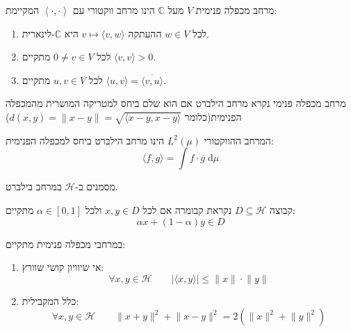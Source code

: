 \documentclass{tstextbook}
\begin{document}
\begin{reminder}
מרחב מכפלה פנימית \(V\) מעל \(\mathbb{C}\) הינו מרחב ווקטורי עם \(\left\langle  \cdot,\cdot  \right\rangle\) המקיימת:

  \begin{enumerate}
    \item לכל \(w \in V\) ההעתקה \(v\mapsto \langle v,w \rangle\) היא \(\mathbb{C}\)-לינארית. 


    \item לכל \(0\neq v \in V\) מתקיים \(\langle v,v \rangle>0\). 


    \item לכל \(u,v \in V\) מתקיים \(\langle u,v \rangle=\overline{\langle v,u \rangle}\). 


  \end{enumerate}
\end{reminder}
\begin{definition}
מרחב מכפלה פנימי נקרא מרחב הילברט אם הוא שלם ביחס למטריקה המושרית מהמכפלה הפנימית(כלומר \(d(x,y)=\lVert x-y \rVert=\sqrt{ \langle x-y,x-y \rangle }\))

\end{definition}
\begin{corollary}
המרחב ההווקטורי \(L^2\left( \mu \right)\) הינו מרחב הילברט ביחס למכפלה הפנימית:
$$\langle f,g \rangle =\int f \cdot \overline{g}  \;\mathrm{d} \mu $$

\end{corollary}
\begin{symbolize}
מסמנים ב-\(\mathcal{H}\) במרחב בילברט.

\end{symbolize}
\begin{definition}
קבוצה \(D \subseteq \mathcal{H}\) נקראת קבומרה אם לכל \(x,y \in D\) ולכל \(\alpha \in[0,1]\) מתקיים:
$$\alpha x+\left( 1-\alpha \right)y \in D$$

\end{definition}
\begin{reminder}
במרחבי מכפלה פנימית מתקיים:

  \begin{enumerate}
    \item אי שיוויון קושי שוורץ: 
$$\forall x,y \in \mathcal{H}\qquad \left\lvert  \langle x,y \rangle   \right\rvert \leq \lVert x \rVert \cdot \lVert y 
\rVert $$


    \item כלל המקבילית: 
$$\forall x,y \in \mathcal{H} \qquad \lVert x+y \rVert ^{2}+\lVert x-y \rVert ^{2}=2\left( \lVert x \rVert^{2}+\lVert y \rVert ^{2}  \right)$$


  \end{enumerate}
\end{reminder}
\end{document}
